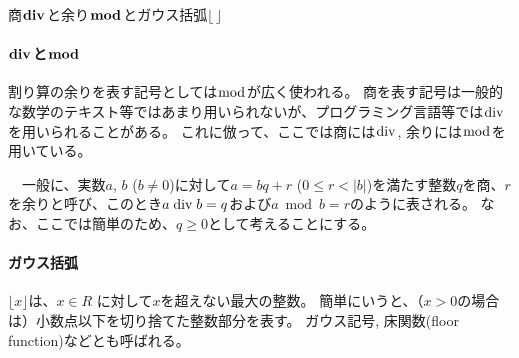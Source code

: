 \begin{\Columnname}{商$\boldsymbol{\bDiv}$と余り$\boldsymbol{\bmod}$とガウス括弧$\boldsymbol{\lfloor\,\rfloor}$}
\renewcommand\theequation{c\thechapter.\arabic{equation}}
\setcounter{equation}{0}
\paragraph*{$\boldsymbol\bDiv$と$\boldsymbol\bmod$}
割り算の余りを表す記号としては$\bmod$が広く使われる。
商を表す記号は一般的な数学のテキスト等ではあまり用いられないが、プログラミング言語等では$\bDiv$を用いられることがある。
これに倣って、ここでは商には$\bDiv$, 余りには$\bmod$を用いている。

　一般に、実数$a$, $b$ ($b\neq0$)に対して$a = bq+r$ ($0 \leq r < |b|$)を満たす整数$q$を商、$r$を余りと呼び、このとき$a \bDiv b = q$および$a \bmod b = r$のように表される。
なお、ここでは簡単のため、$q \geq 0$として考えることにする。
\tcbline*
\paragraph*{ガウス括弧}
$\lfloor x\rfloor$は、$x \in R$ に対して$x$を超えない最大の整数。
簡単にいうと、（$x > 0$の場合は）小数点以下を切り捨てた整数部分を表す。
ガウス記号, 床関数(floor function)などとも呼ばれる。
\end{\Columnname}



